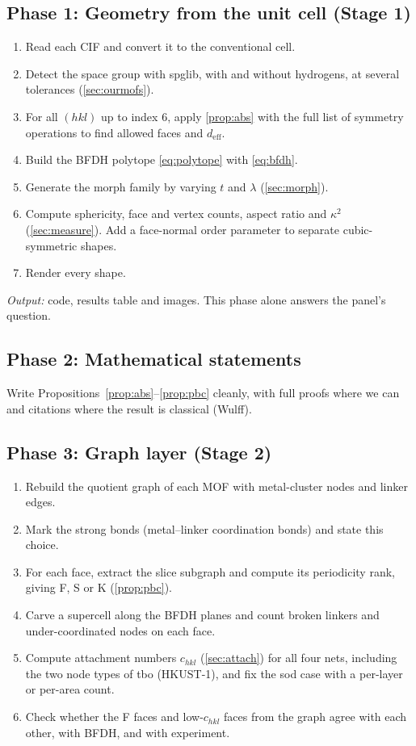 \documentclass[11pt,a4paper]{article}
\theoremstyle{remark}\newtheorem*{example}{Worked example}
\begin{document}
\subsection*{Phase 1: Geometry from the unit cell (Stage 1)}
\begin{enumerate}
\item Read each CIF and convert it to the conventional cell.
\item Detect the space group with spglib, with and without hydrogens, at several tolerances (\autoref{sec:ourmofs}).
\item For all $(hkl)$ up to index 6, apply \autoref{prop:abs} with the full list of symmetry operations to find allowed faces and $d_{\text{eff}}$.
\item Build the BFDH polytope \eqref{eq:polytope} with \eqref{eq:bfdh}.
\item Generate the morph family by varying $t$ and $\lambda$ (\autoref{sec:morph}).
\item Compute sphericity, face and vertex counts, aspect ratio and $\kappa^2$ (\autoref{sec:measure}). Add a face-normal order parameter to separate cubic-symmetric shapes.
\item Render every shape.
\end{enumerate}
\emph{Output:} code, results table and images. This phase alone answers the panel's question.

\subsection*{Phase 2: Mathematical statements}
Write Propositions~\ref{prop:abs}--\ref{prop:pbc} cleanly, with full proofs where we can and citations where the result is classical (Wulff).

\subsection*{Phase 3: Graph layer (Stage 2)}
\begin{enumerate}
\item Rebuild the quotient graph of each MOF with metal-cluster nodes and linker edges.
\item Mark the strong bonds (metal--linker coordination bonds) and state this choice.
\item For each face, extract the slice subgraph and compute its periodicity rank, giving F, S or K (\autoref{prop:pbc}).
\item Carve a supercell along the BFDH planes and count broken linkers and under-coordinated nodes on each face.
\item Compute attachment numbers $c_{hkl}$ (\autoref{sec:attach}) for all four nets, including the two node types of tbo (HKUST-1), and fix the sod case with a per-layer or per-area count.
\item Check whether the F faces and low-$c_{hkl}$ faces from the graph agree with each other, with BFDH, and with experiment.
\end{enumerate}
\end{document}
